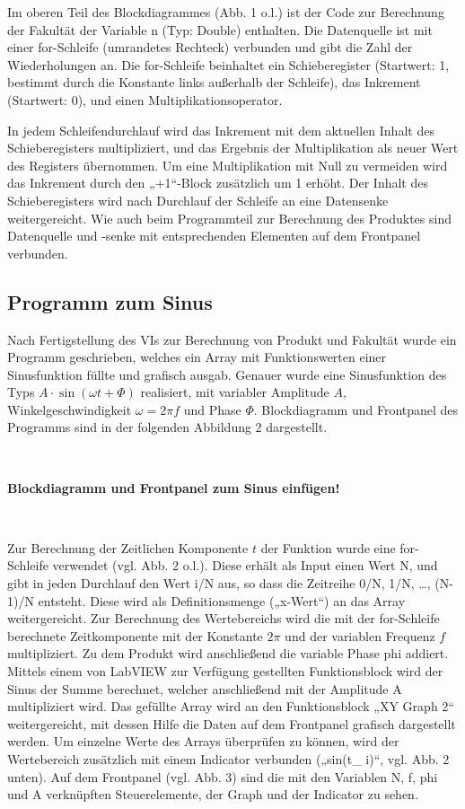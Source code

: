 Im oberen Teil des Blockdiagrammes (Abb. 1 o.l.) ist der Code zur Berechnung der Fakultät der Variable n (Typ: Double) enthalten. Die Datenquelle ist mit einer for-Schleife (umrandetes Rechteck) verbunden und gibt die Zahl der Wiederholungen an. Die for-Schleife beinhaltet ein Schieberegister (Startwert: 1, bestimmt durch die Konstante links außerhalb der Schleife), das Inkrement (Startwert: 0), und einen Multiplikationsoperator.

In jedem Schleifendurchlauf wird das Inkrement mit dem aktuellen Inhalt des Schieberegisters multipliziert, und das Ergebnis der Multiplikation als neuer Wert des Registers übernommen. Um eine Multiplikation mit Null zu vermeiden wird das Inkrement durch den „+1“-Block zusätzlich um 1 erhöht. Der Inhalt des Schieberegisters wird nach Durchlauf der Schleife an eine Datensenke weitergereicht. Wie auch beim Programmteil zur Berechnung des Produktes sind Datenquelle und -senke mit entsprechenden Elementen auf dem Frontpanel verbunden.

\subsection{Programm zum Sinus}

Nach Fertigstellung des VIs zur Berechnung von Produkt und Fakultät wurde ein Programm geschrieben, welches ein Array mit Funktionswerten einer Sinusfunktion füllte und grafisch ausgab. Genauer wurde eine Sinusfunktion des Typs $A\cdot \sin( \omega t + \Phi)$ realisiert, mit variabler Amplitude $A$, Winkelgeschwindigkeit $ \omega=2 \pi f$ und Phase $\Phi$. Blockdiagramm und Frontpanel des Programms sind in der folgenden Abbildung 2 dargestellt.

\

\textbf{Blockdiagramm und Frontpanel zum Sinus einfügen!}

\

Zur Berechnung der Zeitlichen Komponente $t$ der Funktion wurde eine for-Schleife verwendet (vgl. Abb. 2 o.l.). Diese erhält als Input einen Wert N, und gibt in jeden Durchlauf den Wert i/N aus, so dass die Zeitreihe 0/N, 1/N, …, (N-1)/N entsteht. Diese wird als Definitionsmenge („x-Wert“) an das Array weitergereicht. Zur Berechnung des Wertebereichs wird die mit der for-Schleife berechnete Zeitkomponente mit der Konstante $2 \pi$ und der variablen Frequenz $f$ multipliziert. Zu dem Produkt wird anschließend die variable Phase phi addiert. Mittels einem von LabVIEW zur Verfügung gestellten Funktionsblock wird der Sinus der Summe berechnet, welcher anschließend mit der Amplitude A multipliziert wird. Das gefüllte Array wird an den Funktionsblock „XY Graph 2“ weitergereicht, mit dessen Hilfe die Daten auf dem Frontpanel grafisch dargestellt werden. Um einzelne Werte des Arrays überprüfen zu können, wird der Wertebereich zusätzlich mit einem Indicator verbunden („sin(t\_ i)“, vgl. Abb. 2 unten).
Auf dem Frontpanel (vgl. Abb. 3) sind die mit den Variablen N, f, phi  und A verknüpften Steuerelemente, der Graph und der Indicator zu sehen. 


